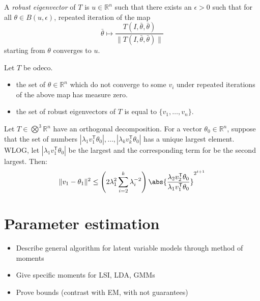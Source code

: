 \begin{definition}
A \emph{robust eigenvector} of $T$ is $u \in \mathbb{R}^n$ such that there exists an $\epsilon > 0$ such that for all $\theta \in B(u,\epsilon)$, repeated iteration of the map
\[\bar{\theta} \mapsto \frac{T(I,\bar{\theta},\bar{\theta})}{\|T(I,\bar{\theta},\bar{\theta})\|}\]
starting from $\theta$ converges to $u$.
\end{definition}

\begin{theorem}
Let $T$ be odeco.
\begin{itemize}
    \item the set of $\theta \in \mathbb{R}^n$ which do not converge to some $v_i$ under repeated iterations of the above map has measure zero.
    \item the set of robust eigenvectors of $T$ is equal to $\{v_1,\dotsc, v_n\}$.
\end{itemize}
\end{theorem}

\begin{lemma}
Let $T \in \bigotimes^3 \mathbb{R}^n$ have an orthogonal decomposition. For a vector $\theta_0 \in \mathbb{R}^n$, suppose that the set of numbers $|\lambda_1 v_1^\mathsf{T}\theta_0|,\dotsc, |\lambda_k v_k ^\mathsf{T} \theta_0|$ has a unique largest element. WLOG, let $|\lambda_1 v_1^\mathsf{T}\theta_0|$ be the largest and the corresponding term for be the second largest. Then:
\[\|v_1 - \theta_1 \|^2 \leq \left(2\lambda_1^{2} \sum_{i=2}^k \lambda_i^{-2}\right)\abs{\frac{\lambda_2v_2^\mathsf{T} \theta_0}{\lambda_1v_1^\mathsf{T}\theta_0}}^{2^{t+1}}\]
\end{lemma}

\section{Parameter estimation}

\begin{itemize}
    \item Describe general algorithm for latent variable models through method of moments
    \item Give specific moments for LSI, LDA, GMMs
    \item Prove bounds (contrast with EM, with not guarantees)
\end{itemize}

